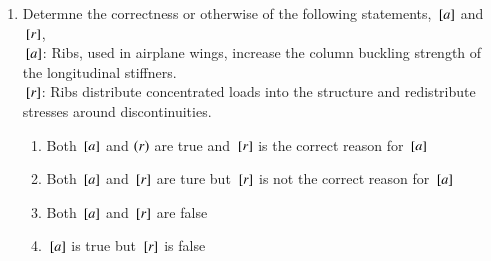 \documentclass[journal,12pt,onecolumn,article]{IEEEtran}
\theoremstyle{remark}
\begin{document}
\begin{enumerate}
\begin{figure}[H]
\begin{minipage}{0.71\textwidth}
				\end{minipage}
\end{figure}
\vspace{-60pt}
	\item Determne the correctness or otherwise of the following statements, ${}\left[a\right]$ and ${}\left[r\right]$, \\
		${}\left[a\right]$: Ribs, used in airplane wings, increase the column buckling strength of the longitudinal stiffners. \\
		${}\left[r\right]$: Ribs distribute concentrated loads into the structure and redistribute stresses around discontinuities.
		\begin{enumerate}
			\item Both ${}\left[a\right]$ and $\left(r\right)$ are true and ${}\left[r\right]$ is the correct reason for ${}\left[a\right]$
			\item Both ${}\left[a\right]$ and ${}\left[r\right]$ are ture but ${}\left[r\right]$ is not the correct reason for ${}\left[a\right]$
			\item Both ${}\left[a\right]$ and ${}\left[r\right]$ are false
			\item ${}\left[a\right]$ is true but ${}\left[r\right]$ is false
		\end{enumerate}
\end{enumerate}
\end{document}
